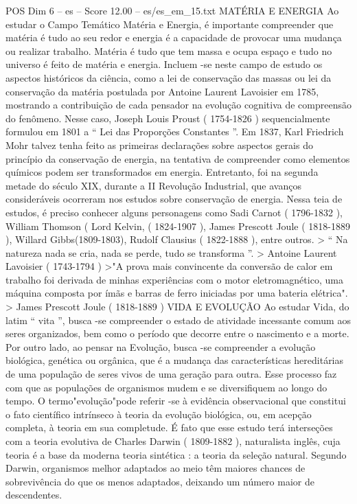 \begin{textsample}{POS Dim 6 – es – Score 12.00 – es/es\_em\_15.txt}
MATÉRIA E ENERGIA Ao estudar o Campo Temático Matéria e Energia, é importante compreender que matéria é tudo ao seu redor e energia é a capacidade de provocar uma mudança ou realizar trabalho.
Matéria é tudo que tem massa e ocupa espaço e tudo no universo é feito de matéria e energia.
Incluem -se neste campo de estudo os aspectos históricos da ciência, como a lei de conservação das massas ou lei da conservação da matéria postulada por Antoine Laurent Lavoisier em 1785, mostrando a contribuição de cada pensador na evolução cognitiva de compreensão do fenômeno.
Nesse caso, Joseph Louis Proust ( 1754-1826 ) sequencialmente formulou em 1801 a “ Lei das Proporções Constantes ”.
Em 1837, Karl Friedrich Mohr talvez tenha feito as primeiras declarações sobre aspectos gerais do princípio da conservação de energia, na tentativa de compreender como elementos químicos podem ser transformados em energia.
Entretanto, foi na segunda metade do século XIX, durante a II Revolução Industrial, que avanços consideráveis ocorreram nos estudos sobre conservação de energia.
Nessa teia de estudos, é preciso conhecer alguns personagens como Sadi Carnot ( 1796-1832 ), William Thomson ( Lord Kelvin, ( 1824-1907 ), James Prescott Joule ( 1818-1889 ), Willard Gibbs(1809-1803), Rudolf Clausius ( 1822-1888 ), entre outros. > “ Na natureza nada se cria, nada se perde, tudo se transforma ”. > Antoine Laurent Lavoisier ( 1743-1794 ) >"A prova mais convincente da conversão de calor em trabalho foi derivada de minhas experiências com o motor eletromagnético, uma máquina composta por ímãs e barras de ferro iniciadas por uma bateria elétrica". > James Prescott Joule ( 1818-1889 ) VIDA E EVOLUÇÃO Ao estudar Vida, do latim “ vita ”, busca -se compreender o estado de atividade incessante comum aos seres organizados, bem como o período que decorre entre o nascimento e a morte.
Por outro lado, ao pensar na Evolução, busca -se compreender a evolução biológica, genética ou orgânica, que é a mudança das características hereditárias de uma população de seres vivos de uma geração para outra.
Esse processo faz com que as populações de organismos mudem e se diversifiquem ao longo do tempo.
O termo"evolução"pode referir -se à evidência observacional que constitui o fato científico intrínseco à teoria da evolução biológica, ou, em acepção completa, à teoria em sua completude.
É fato que esse estudo terá interseções com a teoria evolutiva de Charles Darwin ( 1809-1882 ), naturalista inglês, cuja teoria é a base da moderna teoria sintética : a teoria da seleção natural.
Segundo Darwin, organismos melhor adaptados ao meio têm maiores chances de sobrevivência do que os menos adaptados, deixando um número maior de descendentes.

\end{textsample}
